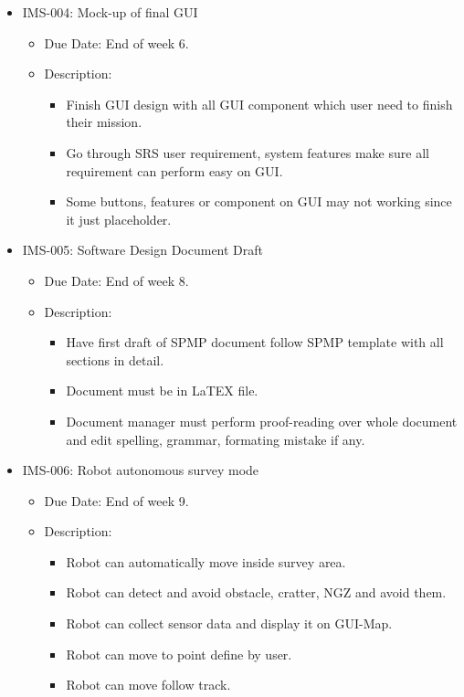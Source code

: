\begin{itemize}
			\item IMS-004: Mock-up of final GUI
			\begin{itemize}
				\item Due Date: End of week 6.
				\item Description:
				\begin{itemize}
					\item Finish GUI design with all GUI component which user need to finish their mission.
					\item Go through SRS user requirement, system features make sure all requirement can perform easy on GUI.
					\item Some buttons, features or component on GUI may not working since it just placeholder. 
				\end{itemize}
			\end{itemize}
			\item IMS-005: Software Design Document Draft
			\begin{itemize}
				\item Due Date: End of week 8.
				\item Description:
				\begin{itemize}
					\item Have first draft of SPMP document follow SPMP template with all sections in detail.
					\item Document must be in LaTEX file.
					\item Document manager must perform proof-reading over whole document and edit spelling, grammar, formating mistake if any.
				\end{itemize}
			\end{itemize}
			\item IMS-006: Robot autonomous survey mode
			\begin{itemize}
				\item Due Date: End of week 9.
				\item Description:
				\begin{itemize}
					\item Robot can automatically move inside survey area.
					\item Robot can detect and avoid obstacle, cratter, NGZ and avoid them.
					\item Robot can collect sensor data and display it on GUI-Map.
					\item Robot can move to point define by user.
					\item Robot can move follow track.
				\end{itemize}

\end{itemize}
\end{itemize}
